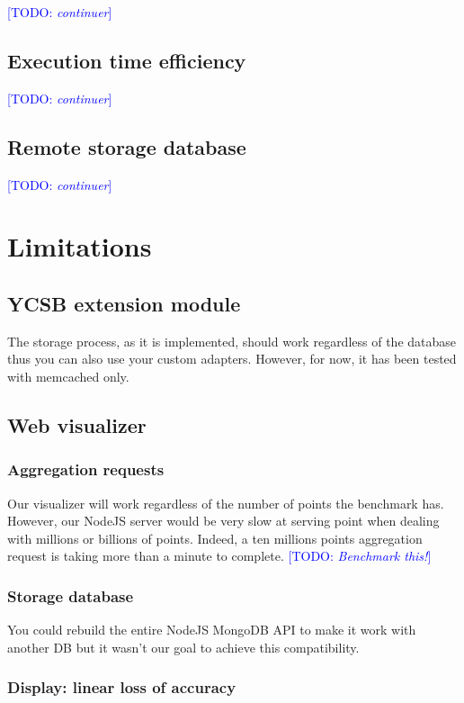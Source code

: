 \documentclass[a4paper,11pt]{report}
\newcommand*{\todo}[1]{\textcolor{blue}{[TODO: \emph{#1}]}}
\begin{document}
\todo{continuer}

\subsection{Execution time efficiency}

\todo{continuer}

\subsection{Remote storage database}

\todo{continuer}

\section{Limitations}

\subsection{YCSB extension module}

The storage process, as it is implemented, should work regardless of the database thus you can also use your custom adapters.
However, for now, it has been tested with memcached only.

\subsection{Web visualizer}

\subsubsection{Aggregation requests}

Our visualizer will work regardless of the number of points the benchmark has. However, our NodeJS server would be very slow at serving point when dealing with millions or billions of points. Indeed, a ten millions points aggregation request is taking more than a minute to complete. \todo{Benchmark this!}

\subsubsection{Storage database}

You could rebuild the entire NodeJS MongoDB API to make it work with another DB but it wasn't our goal to achieve this compatibility.

\subsubsection{Display: linear loss of accuracy}
\end{document}
